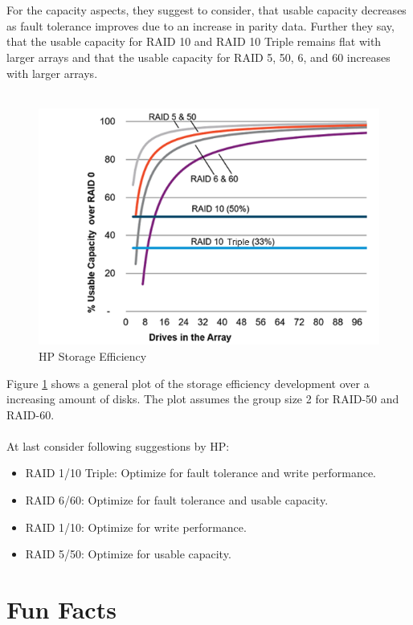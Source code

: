 \documentclass{article}
\begin{document}
\\ \\
For the capacity aspects, they suggest to consider, that usable capacity decreases as 
fault tolerance improves due to an increase in parity data.
Further they say, that the usable capacity for RAID 10 and RAID 10 Triple remains flat with larger arrays and
that the usable capacity for RAID 5, 50, 6, and 60 increases with larger arrays. \cite{hpe:sa-userguide}
\\ \\
\begin{figure}
    \label{fig:hp-storage-efficiency}
    \includegraphics[width=\textwidth]{hp-storage-efficiency}
    \caption{HP Storage Efficiency \cite{hpe:sa-userguide}}
\end{figure}
Figure \ref{fig:hp-storage-efficiency} shows a general plot of the storage efficiency development
over a increasing amount of disks. The plot assumes the group size 2 for RAID-50 and RAID-60. \cite{hpe:sa-userguide}
\\ \\
At last consider following suggestions by HP:
\begin{itemize}
    \item RAID 1/10 Triple: Optimize for fault tolerance and write performance.
    \item RAID 6/60: Optimize for fault tolerance and usable capacity.
    \item RAID 1/10: Optimize for write performance.
    \item RAID 5/50: Optimize for usable capacity.
\end{itemize}

\section*{Fun Facts}
\end{document}

